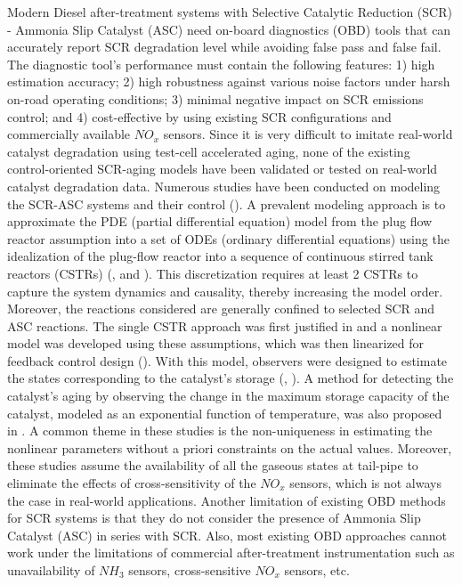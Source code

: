 Modern Diesel after-treatment systems with Selective Catalytic Reduction (SCR) - Ammonia Slip Catalyst (ASC) need
on-board diagnostics (OBD) tools that can accurately report SCR degradation level while avoiding false pass and false
fail. The diagnostic tool's performance must contain the following features: 1) high estimation accuracy; 2) high
robustness against various noise factors under harsh on-road operating conditions; 3) minimal negative impact on SCR
emissions control; and 4) cost-effective by using existing SCR configurations and commercially available $NO_x$ sensors.
Since it is very difficult to imitate real-world catalyst degradation using test-cell accelerated aging, none of the
existing control-oriented SCR-aging models have been validated or tested on real-world catalyst degradation data.
Numerous studies have been conducted on modeling the SCR-ASC systems and their control (\cite{yuan2015diesel}). A
prevalent modeling approach is to approximate the PDE (partial differential equation) model from the plug flow reactor
assumption into a set of ODEs (ordinary differential equations) using the idealization of the plug-flow reactor into a
sequence of continuous stirred tank reactors (CSTRs) (\cite{hsieh2011development}, and \cite{nova2014urea}). This
discretization requires at least 2 CSTRs to capture the system dynamics and causality, thereby increasing the model
order. Moreover, the reactions considered are generally confined to selected SCR and ASC reactions. The single CSTR
approach was first justified in \cite{devarakonda2008adequacy} and a nonlinear model was developed using these
assumptions, which was then linearized for feedback control design (\cite{devarakonda2009model}). With this model,
observers were designed to estimate the states corresponding to the catalyst's storage (\cite{ma2017observer},
\cite{jain2020term}). A method for detecting the catalyst's aging by observing the change in the maximum storage
capacity of the catalyst, modeled as an exponential function of temperature, was also proposed in \cite{ma2017observer}.
A common theme in these studies is the non-uniqueness in estimating the nonlinear parameters without a priori
constraints on the actual values. Moreover, these studies assume the availability of all the gaseous states at tail-pipe
to eliminate the effects of cross-sensitivity of the $NO_x$ sensors, which is not always the case in real-world
applications. Another limitation of existing OBD methods for SCR systems is that they do not consider the presence of
Ammonia Slip Catalyst (ASC) in series with SCR. Also, most existing OBD approaches cannot work under the limitations of
commercial after-treatment instrumentation such as unavailability of $NH_3$ sensors, cross-sensitive $NO_x$ sensors,
etc.

